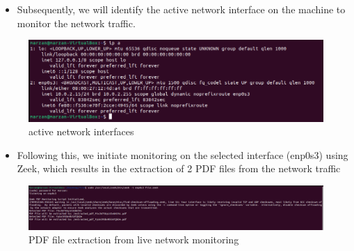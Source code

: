      \begin{itemize}
     \item Subsequently, we will identify the active network interface on the machine to monitor the network traffic.
      \end{itemize}
    \begin{figure}[H]
    \centering
    \includegraphics[width=1\linewidth]{images/ipa.png}
    \caption{active network interfaces}
    \label{fig:enter-label}
\end{figure}
\begin{itemize}

\item Following this, we initiate monitoring on the selected interface (enp0s3) using Zeek, which results in the extraction of 2 PDF files from the network traffic
 \end{itemize}
\begin{figure}[H]
    \centering
    \includegraphics[width=1\linewidth]{images//extract_file/enpos3_file.png}
    \caption{PDF file extraction from live network monitoring}
    \label{fig:enter-label}
\end{figure}

